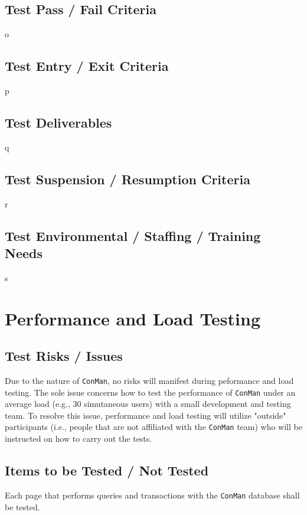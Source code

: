 \documentclass{article}
\begin{document}
\subsection{Test Pass / Fail Criteria}
o

\subsection{Test Entry / Exit Criteria}
p

\subsection{Test Deliverables}
q

\subsection{Test Suspension / Resumption Criteria}
r

\subsection{Test Environmental / Staffing / Training Needs}
s

\newpage
\section{Performance and Load Testing}
\subsection{Test Risks / Issues}
Due to the nature of \texttt{ConMan}, no risks will manifest during peformance 
and load testing. The sole issue concerns how to test the performance of \texttt{ConMan} 
under an average load (e.g., 30 simutaneous users) with a small development and testing 
team. To resolve this issue, performance and load testing will utilize "outside" 
participants (i.e., people that are not affiliated with the 
\texttt{ConMan} team) who will be instructed on how to carry out the tests.

\subsection{Items to be Tested / Not Tested}
Each page that performs queries and transactions with the \texttt{ConMan} 
database shall be tested.
\end{document}
